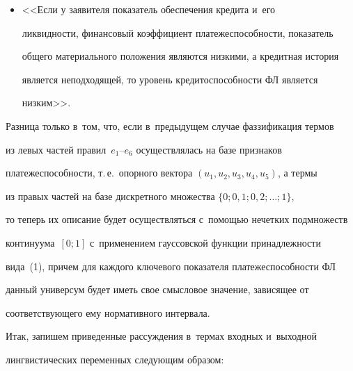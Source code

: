 \begin{itemize}
кре\-ди\-то\-спо\-соб\-ности ФЛ все же является высоким>>; 

  

\item[$c_6$:] <<Если у заявителя показатель обеспечения кредита и~его 

ликвидности, финансовый коэффициент платежеспособности, показатель 

общего материального положения являются низкими, а кредитная история 

является неподходящей, то уровень кредитоспособности ФЛ является 

низким>>.

\end{itemize}

  

  Разница только в~том, что, если в~предыдущем случае фаззификация термов 

из левых частей правил~$e_1$--$e_6$ осуществлялась на базе признаков 

платежеспособности, т.\,е.\ опорного вектора $(u_1, u_2, u_3, u_4, u_5)$, а термы 

из правых частей на базе дискретного множества $\{0; 0{,}1; 0,{2}; \ldots; 1\}$, 

то теперь их описание будет осуществляться с~помощью нечетких подмножеств 

континуума~$[0; 1]$ с~применением гауссовской функции принадлежности 

вида~(1), причем для каждого ключевого показателя платежеспособности ФЛ 

данный универсум будет иметь свое смыс\-ло\-вое значение, зависящее от 

соответствующего ему нормативного интервала. 

  

  Итак, запишем приведенные рассуждения в~термах входных и~выходной 

лингвистических переменных следующим образом: 

